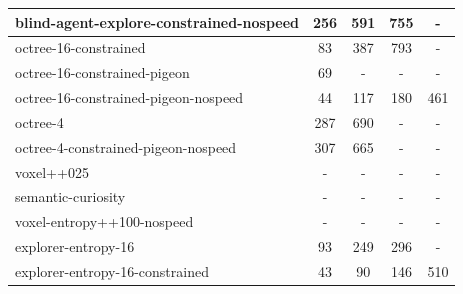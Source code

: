 \begin{longtable}{|l|c|c|c|c|}
blind-agent-explore-constrained-nospeed & {\cellcolor[HTML]{BADBD4}} \color[HTML]{000000} 256 & {\cellcolor[HTML]{CFE5E0}} \color[HTML]{000000} 591 & {\cellcolor[HTML]{E2EEEB}} \color[HTML]{000000} 755 &    -     \\ \hline
octree-16-constrained & {\cellcolor[HTML]{55AA99}} \color[HTML]{000000} 83 & {\cellcolor[HTML]{97CABF}} \color[HTML]{000000} 387 & {\cellcolor[HTML]{EBF2F0}} \color[HTML]{000000} 793 &    -     \\ \hline
octree-16-constrained-pigeon & {\cellcolor[HTML]{55AA99}} \color[HTML]{000000} 69 &    -     &    -     &    -     \\ \hline
octree-16-constrained-pigeon-nospeed & {\cellcolor[HTML]{55AA99}} \color[HTML]{000000} 44 & {\cellcolor[HTML]{55AA99}} \color[HTML]{000000} 117 & {\cellcolor[HTML]{5BAD9D}} \color[HTML]{000000} 180 & {\cellcolor[HTML]{D7C5AF}} \color[HTML]{000000} 461 \\ \hline
octree-4 & {\cellcolor[HTML]{D8E9E5}} \color[HTML]{000000} 287 & {\cellcolor[HTML]{EBF2F0}} \color[HTML]{000000} 690 &    -     &    -     \\ \hline
octree-4-constrained-pigeon-nospeed & {\cellcolor[HTML]{EBF2F0}} \color[HTML]{000000} 307 & {\cellcolor[HTML]{E4EFEC}} \color[HTML]{000000} 665 &    -     &    -     \\ \hline
voxel++025 &    -     &    -     &    -     &    -     \\ \hline
semantic-curiosity &    -     &    -     &    -     &    -     \\ \hline
voxel-entropy++100-nospeed &    -     &    -     &    -     &    -     \\ \hline
explorer-entropy-16 & {\cellcolor[HTML]{55AA99}} \color[HTML]{000000} 93 & {\cellcolor[HTML]{70B7A9}} \color[HTML]{000000} 249 & {\cellcolor[HTML]{77BAAD}} \color[HTML]{000000} 296 &    -     \\ \hline
explorer-entropy-16-constrained & {\cellcolor[HTML]{55AA99}} \color[HTML]{000000} 43 & {\cellcolor[HTML]{55AA99}} \color[HTML]{000000} 90 & {\cellcolor[HTML]{55AA99}} \color[HTML]{000000} 146 & {\cellcolor[HTML]{D7C5AF}} \color[HTML]{000000} 510 \\ \hline

\end{longtable}

